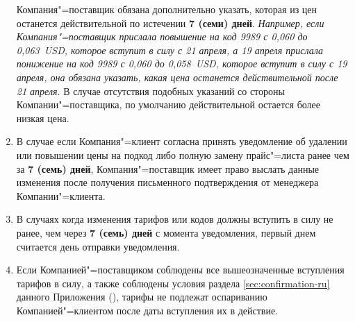 \begin{Form}
\begin{enumerate}[label=\thesection.\arabic*.]
          Компания"=поставщик обязана дополнительно указать, которая из цен останется действительной по истечении
          \textbf{7 (семи) дней}. \textit{Например, если Компания"=поставщик прислала повышение на код 9989 с 0,060
          до 0,063~USD, которое вступит в силу с 21 апреля, а 19 апреля прислала понижение на код 9989 с 0,060 до
          0,058~USD, которое вступит в силу с 19 апреля, она обязана указать, какая цена останется действительной после
          21 апреля}.
          В случае отсутствия подобных указаний со стороны Компании"=поставщика, по умолчанию действительной остается
          более низкая цена.
    \item В случае если Компания"=клиент согласна принять уведомление об удалении или повышении цены на подкод
          либо полную замену    прайс"=листа ранее чем за \textbf{7 (семь) дней}, Компания"=поставщик имеет право выслать данные
          изменения после получения письменного подтверждения от менеджера Компании"=клиента.
    \item В случаях когда изменения тарифов или кодов должны вступить в силу не ранее, чем через
          \textbf{7 (семь) дней} с момента уведомления, первый днем считается день отправки уведомления.
    \item Если Компанией"=поставщиком соблюдены все вышеозначенные вступления тарифов в силу,
          а также соблюдены условия раздела \ref{sec:confirmation-ru} данного Приложения
          (\flqq{}\frqq{}), тарифы не подлежат оспариванию Компанией"=клиентом
          после даты вступления их в действие.
  \end{enumerate}
  


\end{Form}
